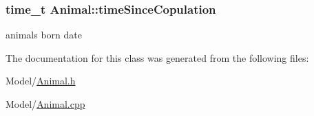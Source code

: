 \subsubsection[{time\+Since\+Copulation}]{\setlength{\rightskip}{0pt plus 5cm}time\+\_\+t Animal\+::time\+Since\+Copulation\hspace{0.3cm}{\ttfamily [protected]}}\label{class_animal_a944296b52e238a919c56f3738bd31989}
animal\textquotesingle{}s born date 

The documentation for this class was generated from the following files\+:\begin{DoxyCompactItemize}
\item 
Model/\hyperlink{_animal_8h}{Animal.\+h}\item 
Model/\hyperlink{_animal_8cpp}{Animal.\+cpp}\end{DoxyCompactItemize}
